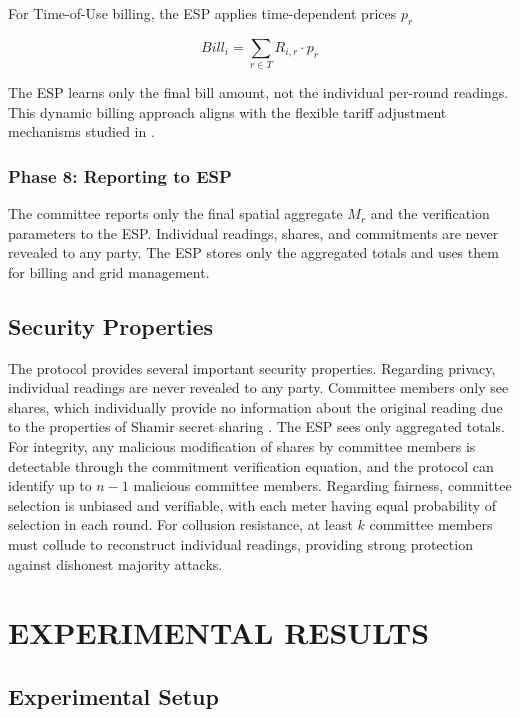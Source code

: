 \documentclass[conference]{IEEEtran}
\begin{document}
For Time-of-Use billing, the ESP applies time-dependent prices $p_r$

\begin{equation}
\mathit{Bill}_i = \sum_{r \in T} R_{i,r} \cdot p_r
\end{equation}

The ESP learns only the final bill amount, not the individual per-round readings. This dynamic billing approach aligns with the flexible tariff adjustment mechanisms studied in \cite{zaredar2024lightweight}.

\subsubsection{Phase 8: Reporting to ESP}

The committee reports only the final spatial aggregate $M_r$ and the verification parameters to the ESP. Individual readings, shares, and commitments are never revealed to any party. The ESP stores only the aggregated totals and uses them for billing and grid management.

\subsection{Security Properties}

The protocol provides several important security properties. Regarding privacy, individual readings are never revealed to any party. Committee members only see shares, which individually provide no information about the original reading due to the properties of Shamir secret sharing \cite{shamir1979how}. The ESP sees only aggregated totals. For integrity, any malicious modification of shares by committee members is detectable through the commitment verification equation, and the protocol can identify up to $n-1$ malicious committee members. Regarding fairness, committee selection is unbiased and verifiable, with each meter having equal probability of selection in each round. For collusion resistance, at least $k$ committee members must collude to reconstruct individual readings, providing strong protection against dishonest majority attacks.

\section{EXPERIMENTAL RESULTS}

\subsection{Experimental Setup}
\end{document}
